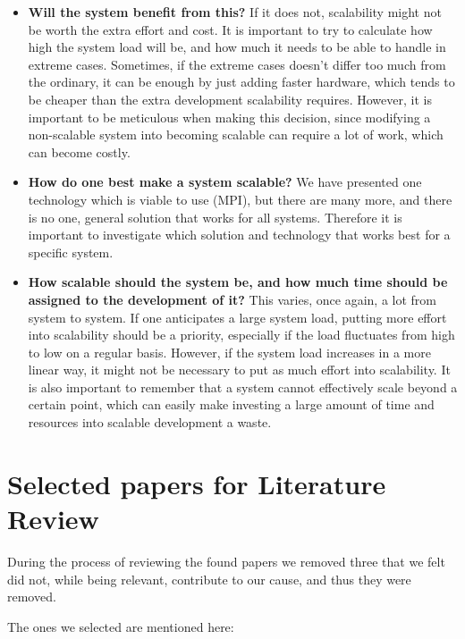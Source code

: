 \documentclass{article}
\begin{document}
\begin{itemize}
\item{\textbf{Will the system benefit from this?} If it does not, scalability
might not be worth the extra effort and cost. It is important to try to
calculate how high the system load will be, and how much it needs to be able to
handle in extreme cases. Sometimes, if the extreme cases doesn't differ too
much from the ordinary, it can be enough by just adding faster hardware, which
tends to be cheaper than the extra development scalability requires. However,
it is important to be meticulous when making this decision, since modifying a
non-scalable system into becoming scalable can require a lot of work, which can
become costly.}

\item{\textbf{How do one best make a system scalable?} We have presented one
technology which is viable to use (MPI), but there are many more, and there is
no one, general solution that works for all systems. Therefore it is important
to investigate which solution and technology that works best for a specific
system.}

\item{\textbf{How scalable should the system be, and how much time should be assigned
to the development of it?} This varies, once again, a lot from system to system.
If one anticipates a large system load, putting more effort into scalability
should be a priority, especially if the load fluctuates from high to low on a
regular basis. However, if the system load increases in a more linear way, it
might not be necessary to put as much effort into scalability. It is also
important to remember that a system cannot effectively scale beyond a certain
point, which can easily make investing a large amount of time and resources
into scalable development a waste.} 
\end{itemize}

\newpage




\newpage
 
\appendix
\section{Selected papers for Literature Review}
During the process of reviewing the found papers we removed three that we felt
did not, while being relevant, contribute to our cause, and thus they were
removed. 

The ones we selected are mentioned here:
\end{document}
